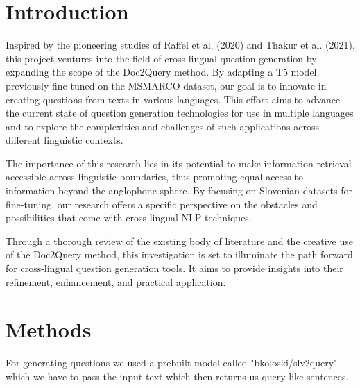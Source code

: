 \documentclass[fleqn,moreauthors,10pt]{ds_report}
\affiliation{\textit{Advisors: Boshko}}
\begin{document}
\flushbottom 

\maketitle 

\thispagestyle{empty} 


\section*{Introduction}
	Inspired by the pioneering studies of Raffel et al. (2020) and Thakur et al. (2021), this project ventures into the field of cross-lingual question generation by expanding the scope of the Doc2Query method. By adapting a T5 model, previously fine-tuned on the MSMARCO dataset, our goal is to innovate in creating questions from texts in various languages. This effort aims to advance the current state of question generation technologies for use in multiple languages and to explore the complexities and challenges of such applications across different linguistic contexts.

	The importance of this research lies in its potential to make information retrieval accessible across linguistic boundaries, thus promoting equal access to information beyond the anglophone sphere. By focusing on Slovenian datasets for fine-tuning, our research offers a specific perspective on the obstacles and possibilities that come with cross-lingual NLP techniques.

	Through a thorough review of the existing body of literature and the creative use of the Doc2Query method, this investigation is set to illuminate the path forward for cross-lingual question generation tools. It aims to provide insights into their refinement, enhancement, and practical application.



\section*{Methods}
For generating questions we used a prebuilt model called "bkoloski/slv\textunderscore 2query" which we have to pass the input text which then returns us query-like sentences.
\end{document}
